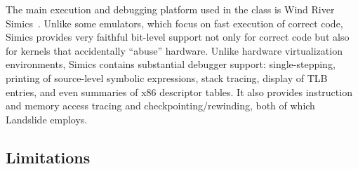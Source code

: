 The main execution and debugging
platform used in the class is
Wind River Simics~\cite{simics}.
Unlike some emulators,
which focus on fast execution of correct code,
Simics
provides very faithful bit-level support
not only for correct code %
but also for kernels that accidentally ``abuse'' hardware.
Unlike hardware virtualization environments,
Simics contains substantial debugger support:
single-stepping,
printing of source-level symbolic
expressions,
stack tracing,
display of TLB entries,
and even summaries of x86
descriptor tables.
It also provides instruction and memory access tracing and checkpointing/rewinding, both of which Landslide employs.


\subsection{Limitations}


